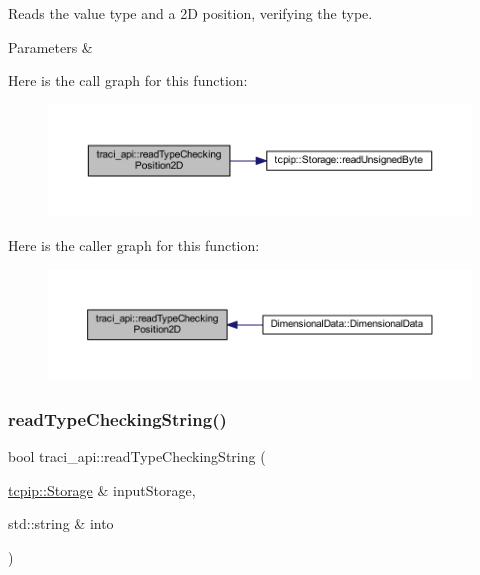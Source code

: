 Reads the value type and a 2D position, verifying the type. 


\begin{DoxyParams}{Parameters}
{\em } & \\
\hline
\end{DoxyParams}
Here is the call graph for this function\+:
\nopagebreak
\begin{figure}[H]
\begin{center}
\leavevmode
\includegraphics[width=350pt]{namespacetraci__api_a26421201e19b2667e198708c2216ca06_cgraph}
\end{center}
\end{figure}
Here is the caller graph for this function\+:
\nopagebreak
\begin{figure}[H]
\begin{center}
\leavevmode
\includegraphics[width=350pt]{namespacetraci__api_a26421201e19b2667e198708c2216ca06_icgraph}
\end{center}
\end{figure}
\mbox{\label{namespacetraci__api_ac51a66efdbed4dcdcef596643fe387ec}} 
\subsubsection{\texorpdfstring{read\+Type\+Checking\+String()}{readTypeCheckingString()}}
{\footnotesize\ttfamily bool traci\+\_\+api\+::read\+Type\+Checking\+String (\begin{DoxyParamCaption}\item[{\hyperlink{classtcpip_1_1_storage}{tcpip\+::\+Storage} \&}]{input\+Storage,  }\item[{std\+::string \&}]{into }\end{DoxyParamCaption})}



